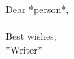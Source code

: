 \documentclass[11pt]{article}
\title{\sc{Title}}
\author{Author}
\date{\today}
\begin{document}
Dear *person*,\\

\lipsum[1]\\

Best wishes,\\
*Writer*
     

\end{document}
